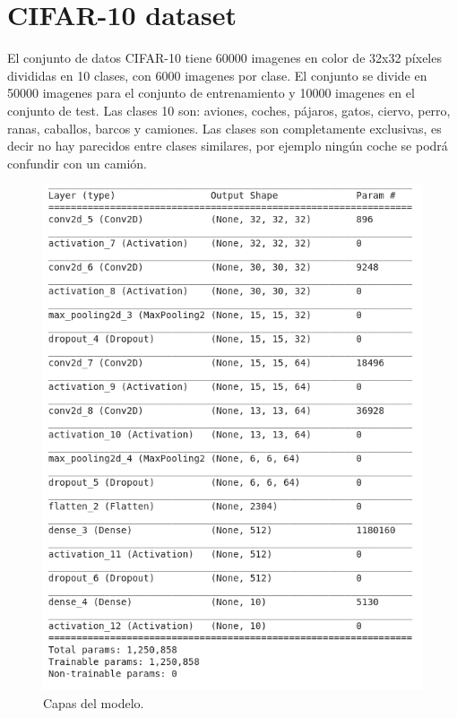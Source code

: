 \documentclass[
  a4paper,
  12pt,
  spanish,
]{scrartcl}
\theoremstyle{teorema-style}
\begin{document}
\section{CIFAR-10 dataset}
El conjunto de datos CIFAR-10 tiene 60000 imagenes en color de 32x32 píxeles divididas en 10 clases, con 6000 imagenes por clase. El conjunto se divide en 50000 imagenes para el conjunto de entrenamiento y 10000 imagenes en el conjunto de test.
Las clases 10 son: aviones, coches, pájaros, gatos, ciervo, perro, ranas, caballos, barcos y camiones.
Las clases son completamente exclusivas, es decir no hay parecidos entre clases similares, por ejemplo ningún coche se podrá confundir con un camión.

\begin{figure}[h]
  \centering
  \includegraphics[width=.8\textwidth]{img/model}
  \caption{Capas del modelo.}
  \label{fig:model}
\end{figure}


\newpage
\printbibliography
\end{document}
